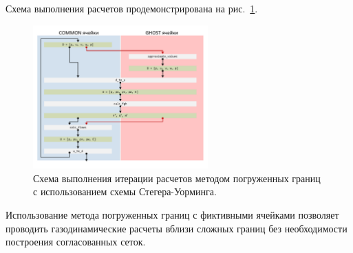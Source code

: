 Схема выполнения расчетов продемонстрирована на рис.~\ref{fig:text_4_ibm_immersed_boundary_method_cheme}.

\begin{figure}[ht]
\centering
\includegraphics[width=0.6\textwidth]{./pics/text_4_ibm/immersed_boundary_method_scheme.pdf}
\singlespacing
{}\caption{Схема выполнения итерации расчетов методом погруженных границ с использованием схемы Стегера-Уорминга.}
\label{fig:text_4_ibm_immersed_boundary_method_cheme}
\end{figure}

Использование метода погруженных границ с фиктивными ячейками позволяет проводить газодинамические расчеты вблизи сложных границ без необходимости построения согласованных сеток.


